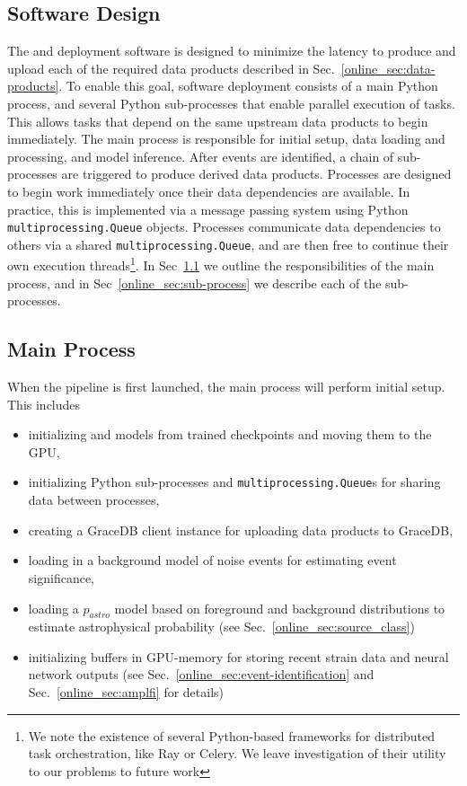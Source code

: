 \begin{refsection}
\section{Software Design} \label{online_sec:software-arch}
The \aframe and \amplfi deployment software is designed to minimize the latency to produce and upload each of the required data products described in Sec.~\ref{online_sec:data-products}. 
To enable this goal, software deployment consists of a main Python process, and several Python sub-processes that enable parallel execution of tasks. 
This allows tasks that depend on the same upstream data products to begin immediately. 
The main process is responsible for initial setup, data loading and processing, and model inference. 
After events are identified, a chain of sub-processes are triggered to produce derived data products. 
Processes are designed to begin work immediately once their data dependencies are available. 
In practice, this is implemented via a message passing system using Python \texttt{multiprocessing.Queue} objects.
Processes communicate data dependencies to others via a shared \texttt{multiprocessing.Queue}, and are then free to continue their own execution threads\footnote{We note the existence of several Python-based frameworks for distributed task orchestration, like Ray or Celery. We leave investigation of their utility to our problems to future work}. 
In Sec~\ref{online_sec:main-process} we outline the responsibilities of the main process, and in Sec~\ref{online_sec:sub-process} we describe each of the sub-processes.

\subsection{Main Process} \label{online_sec:main-process}
When the pipeline is first launched, the main process will perform initial setup. 
This includes 

\begin{itemize}
    \item initializing \aframe and \amplfi models from trained checkpoints and moving them to the GPU,
    \item initializing Python sub-processes and \texttt{multiprocessing.Queue}s for sharing data between processes,
    \item creating a GraceDB client instance for uploading data products to GraceDB,
    \item loading in a background model of noise events for estimating event significance,
    \item loading a $p_{astro}$ model based on foreground and background distributions to estimate astrophysical probability (see Sec.~\ref{online_sec:source_class})
    \item initializing buffers in GPU-memory for storing recent strain data and neural network outputs (see Sec.~\ref{online_sec:event-identification} and Sec.~\ref{online_sec:amplfi} for details)
\end{itemize}


\end{refsection}
